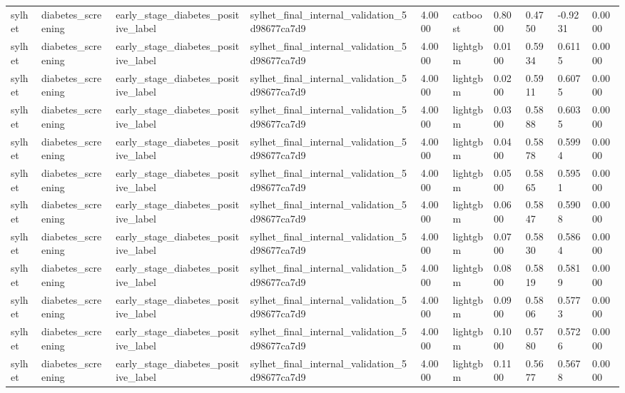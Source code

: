 \begin{tabular}{llllllllll}
sylhet & diabetes\_screening & early\_stage\_diabetes\_positive\_label & sylhet\_final\_internal\_validation\_5d98677ca7d9 & 4.0000 & catboost & 0.8000 & 0.4750 & -0.9231 & 0.0000 \\
sylhet & diabetes\_screening & early\_stage\_diabetes\_positive\_label & sylhet\_final\_internal\_validation\_5d98677ca7d9 & 4.0000 & lightgbm & 0.0100 & 0.5934 & 0.6115 & 0.0000 \\
sylhet & diabetes\_screening & early\_stage\_diabetes\_positive\_label & sylhet\_final\_internal\_validation\_5d98677ca7d9 & 4.0000 & lightgbm & 0.0200 & 0.5911 & 0.6075 & 0.0000 \\
sylhet & diabetes\_screening & early\_stage\_diabetes\_positive\_label & sylhet\_final\_internal\_validation\_5d98677ca7d9 & 4.0000 & lightgbm & 0.0300 & 0.5888 & 0.6035 & 0.0000 \\
sylhet & diabetes\_screening & early\_stage\_diabetes\_positive\_label & sylhet\_final\_internal\_validation\_5d98677ca7d9 & 4.0000 & lightgbm & 0.0400 & 0.5878 & 0.5994 & 0.0000 \\
sylhet & diabetes\_screening & early\_stage\_diabetes\_positive\_label & sylhet\_final\_internal\_validation\_5d98677ca7d9 & 4.0000 & lightgbm & 0.0500 & 0.5865 & 0.5951 & 0.0000 \\
sylhet & diabetes\_screening & early\_stage\_diabetes\_positive\_label & sylhet\_final\_internal\_validation\_5d98677ca7d9 & 4.0000 & lightgbm & 0.0600 & 0.5847 & 0.5908 & 0.0000 \\
sylhet & diabetes\_screening & early\_stage\_diabetes\_positive\_label & sylhet\_final\_internal\_validation\_5d98677ca7d9 & 4.0000 & lightgbm & 0.0700 & 0.5830 & 0.5864 & 0.0000 \\
sylhet & diabetes\_screening & early\_stage\_diabetes\_positive\_label & sylhet\_final\_internal\_validation\_5d98677ca7d9 & 4.0000 & lightgbm & 0.0800 & 0.5819 & 0.5819 & 0.0000 \\
sylhet & diabetes\_screening & early\_stage\_diabetes\_positive\_label & sylhet\_final\_internal\_validation\_5d98677ca7d9 & 4.0000 & lightgbm & 0.0900 & 0.5806 & 0.5773 & 0.0000 \\
sylhet & diabetes\_screening & early\_stage\_diabetes\_positive\_label & sylhet\_final\_internal\_validation\_5d98677ca7d9 & 4.0000 & lightgbm & 0.1000 & 0.5780 & 0.5726 & 0.0000 \\
sylhet & diabetes\_screening & early\_stage\_diabetes\_positive\_label & sylhet\_final\_internal\_validation\_5d98677ca7d9 & 4.0000 & lightgbm & 0.1100 & 0.5677 & 0.5678 & 0.0000 \\

\end{tabular}
